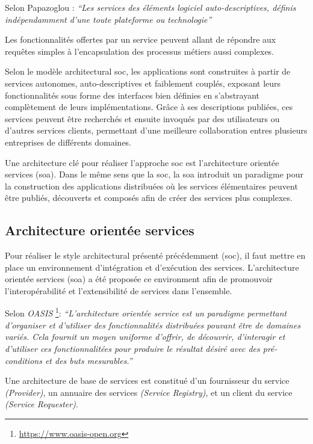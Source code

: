   Selon Papazoglou \cite{papazoglou2003service}: \textit{``Les
    services des éléments logiciel auto-descriptives, définis
    indépendamment d'une toute plateforme ou technologie''}\bigskip

  Les fonctionnalités offertes par un service peuvent allant de
  répondre aux requêtes simples à l'encapsulation des processus
  métiers aussi complexes.\medskip

  Selon le modèle architectural \acrshort{soc}, les applications sont
  construites à partir de services autonomes, auto-descriptives et
  faiblement couplés, exposant leurs fonctionnalités sous forme des
  interfaces bien définies en s'abstrayant complètement de leurs
  implémentations. Grâce à ses descriptions publiées, ces services
  peuvent être recherchés et ensuite invoqués par des utilisateurs ou
  d'autres services clients, permettant d'une meilleure collaboration
  entres plusieurs entreprises de différents domaines.\medskip

  Une architecture clé pour réaliser l'approche \acrshort{soc} est
  l'architecture orientée services (\acrshort{soa}).  Dans le même
  sens que la \acrshort{soc}, la \acrshort{soa} introduit un paradigme
  pour la construction des applications distribuées où les services
  élémentaires peuvent être publiés, découverts et composés afin de
  créer des services plus complexes.

  \subsection{Architecture orientée services}
  \label{sec:soa}

  Pour réaliser le style architectural présenté précédemment
  (\acrshort{soc}), il faut mettre en place un environnement
  d'intégration et d'exécution des services. L'architecture orientée
  services (\acrshort{soa}) a été proposée ce environment afin de
  promouvoir l'interopérabilité et l'extensibilité de services dans
  l'ensemble.\bigskip

  Selon \textit{OASIS} \footnote{\url{https://www.oasis-open.org}}:
  \textit{``L'architecture orientée service est un paradigme
    permettant d'organiser et d'utiliser des fonctionnalités
    distribuées pouvant être de domaines variés. Cela fournit un moyen
    uniforme d'offrir, de découvrir, d'interagir et d'utiliser ces
    fonctionnalitées pour produire le résultat désiré avec des
    pré-conditions et des buts mesurables.''}\bigskip

  Une architecture de base de services
  \cite{gottschalk2002introduction} est constitué d'un fournisseur du
  service \textit{(Provider)}, un annuaire des services
  \textit{(Service Registry)}, et un client du service
  \textit{(Service Requester)}.

